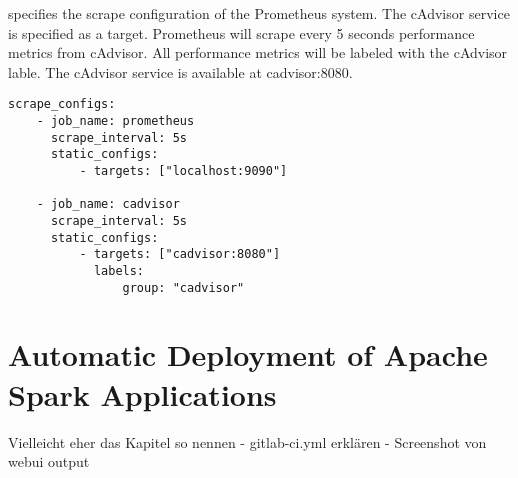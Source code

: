  specifies the scrape configuration of the Prometheus system.
The cAdvisor service is specified as a target. Prometheus will scrape every 5 seconds performance metrics from cAdvisor. All performance metrics will be labeled with the cAdvisor lable. The cAdvisor service is available at  cadvisor:8080.


\begin{lstlisting}[label=lst:06_computing_am_prom-config, caption=Prometheus target configuration in YAML syntax]
scrape_configs:
    - job_name: prometheus
      scrape_interval: 5s
      static_configs:
          - targets: ["localhost:9090"]
 
    - job_name: cadvisor
      scrape_interval: 5s
      static_configs:
          - targets: ["cadvisor:8080"]
            labels:
                group: "cadvisor"
\end{lstlisting}


\section{Automatic Deployment of Apache Spark Applications}
Vielleicht eher das Kapitel so nennen
- gitlab-ci.yml erklären
- Screenshot von webui output
